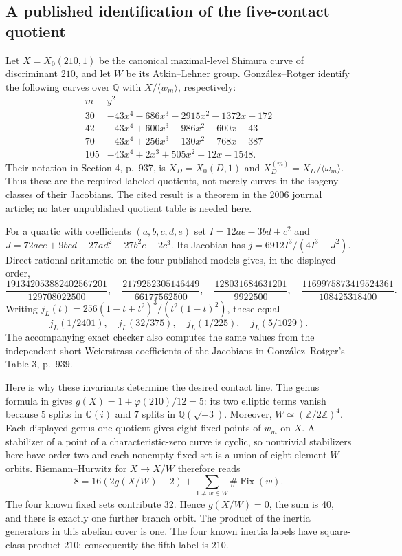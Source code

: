 \subsection{A published identification of the five-contact quotient}
Let $X=X_0(210,1)$ be the canonical maximal-level Shimura curve of
discriminant $210$, and let $W$ be its Atkin--Lehner group.
Gonz\'alez--Rotger \cite[Theorem 4.2 and Table 2, pp.~938--939]{GonzalezRotger2006}
identify the following curves over $\mathbb Q$ with
$X/\langle w_m\rangle$, respectively:
\[
\begin{array}{c|l}
m&y^2\\\hline
30&-43x^4-686x^3-2915x^2-1372x-172\\
42&-43x^4+600x^3-986x^2-600x-43\\
70&-43x^4+256x^3-130x^2-768x-387\\
105&-43x^4+2x^3+505x^2+12x-1548.
\end{array}
\]
Their notation in Section 4, p.~937, is
$X_D=X_0(D,1)$ and $X_D^{(m)}=X_D/\langle\omega_m\rangle$.
Thus these are the required labeled quotients, not merely curves in
the isogeny classes of their Jacobians. The cited result is a theorem
in the 2006 journal article; no later unpublished quotient table is
needed here.

For a quartic with coefficients $(a,b,c,d,e)$ set
$I=12ae-3bd+c^2$ and
$J=72ace+9bcd-27ad^2-27b^2e-2c^3$.
Its Jacobian has $j=6912I^3/(4I^3-J^2)$. Direct rational arithmetic
on the four published models gives, in the displayed order,
\[
\frac{191342053882402567201}{129708022500},\quad
\frac{2179252305146449}{66177562500},\quad
\frac{128031684631201}{9922500},\quad
\frac{1169975873419524361}{108425318400}.
\]
Writing $j_L(t)=256(1-t+t^2)^3/(t^2(1-t)^2)$, these equal
\[
 j_L(1/2401),\quad j_L(32/375),\quad
 j_L(1/225),\quad j_L(5/1029).
\]
The accompanying exact checker also computes the same values from
the independent short-Weierstrass coefficients of the Jacobians
in Gonz\'alez--Rotger's Table 3, p.~939.

Here is why these invariants determine the desired contact line.
The genus formula in \cite[Proposition 5.2, pp.~940--941]{GonzalezRotger2006}
gives $g(X)=1+\varphi(210)/12=5$: its two elliptic terms vanish
because $5$ splits in $\mathbb Q(i)$ and $7$ splits in
$\mathbb Q(\sqrt{-3})$. Moreover,
$W\simeq(\mathbb Z/2\mathbb Z)^4$.
Each displayed genus-one quotient gives eight fixed points of $w_m$
on $X$. A stabilizer of a point of a characteristic-zero curve is
cyclic, so nontrivial stabilizers here have order two and each
nonempty fixed set is a union of eight-element $W$-orbits.
Riemann--Hurwitz for $X\to X/W$ therefore reads
\[
 8=16(2g(X/W)-2)+\sum_{1\ne w\in W}\#\operatorname{Fix}(w).
\]
The four known fixed sets contribute 32. Hence $g(X/W)=0$, the sum
is 40, and there is exactly one further branch orbit. The product
of the inertia generators in this abelian cover is one. The four
known inertia labels have square-class product $210$; consequently
the fifth label is $210$.

